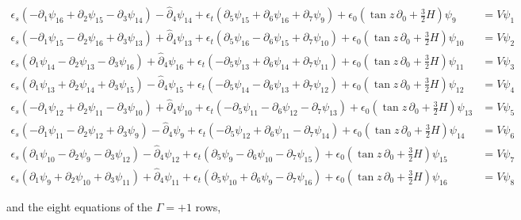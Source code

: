 \documentclass[11pt]{article}
\begin{document}
\[
\begin{aligned}
\epsilon_s(-\partial_1\psi_{16} + \partial_2\psi_{15} - \partial_3\psi_{14}) - \hat\partial_4\psi_{14} + \epsilon_t(\partial_5\psi_{15} + \partial_6\psi_{16} + \partial_7\psi_{9}) + \epsilon_0(\tan z\,\partial_0 + \tfrac32H)\psi_{9} &= V\psi_{1} \\
\epsilon_s(-\partial_1\psi_{15} - \partial_2\psi_{16} + \partial_3\psi_{13}) + \hat\partial_4\psi_{13} + \epsilon_t(\partial_5\psi_{16} - \partial_6\psi_{15} + \partial_7\psi_{10}) + \epsilon_0(\tan z\,\partial_0 + \tfrac32H)\psi_{10} &= V\psi_{2} \\
\epsilon_s(\partial_1\psi_{14} - \partial_2\psi_{13} - \partial_3\psi_{16}) + \hat\partial_4\psi_{16} + \epsilon_t(-\partial_5\psi_{13} + \partial_6\psi_{14} + \partial_7\psi_{11}) + \epsilon_0(\tan z\,\partial_0 + \tfrac32H)\psi_{11} &= V\psi_{3} \\
\epsilon_s(\partial_1\psi_{13} + \partial_2\psi_{14} + \partial_3\psi_{15}) - \hat\partial_4\psi_{15} + \epsilon_t(-\partial_5\psi_{14} - \partial_6\psi_{13} + \partial_7\psi_{12}) + \epsilon_0(\tan z\,\partial_0 + \tfrac32H)\psi_{12} &= V\psi_{4} \\
\epsilon_s(-\partial_1\psi_{12} + \partial_2\psi_{11} - \partial_3\psi_{10}) + \hat\partial_4\psi_{10} + \epsilon_t(-\partial_5\psi_{11} - \partial_6\psi_{12} - \partial_7\psi_{13}) + \epsilon_0(\tan z\,\partial_0 + \tfrac32H)\psi_{13} &= V\psi_{5} \\
\epsilon_s(-\partial_1\psi_{11} - \partial_2\psi_{12} + \partial_3\psi_{9}) - \hat\partial_4\psi_{9} + \epsilon_t(-\partial_5\psi_{12} + \partial_6\psi_{11} - \partial_7\psi_{14}) + \epsilon_0(\tan z\,\partial_0 + \tfrac32H)\psi_{14} &= V\psi_{6} \\
\epsilon_s(\partial_1\psi_{10} - \partial_2\psi_{9} - \partial_3\psi_{12}) - \hat\partial_4\psi_{12} + \epsilon_t(\partial_5\psi_{9} - \partial_6\psi_{10} - \partial_7\psi_{15}) + \epsilon_0(\tan z\,\partial_0 + \tfrac32H)\psi_{15} &= V\psi_{7} \\
\epsilon_s(\partial_1\psi_{9} + \partial_2\psi_{10} + \partial_3\psi_{11}) + \hat\partial_4\psi_{11} + \epsilon_t(\partial_5\psi_{10} + \partial_6\psi_{9} - \partial_7\psi_{16}) + \epsilon_0(\tan z\,\partial_0 + \tfrac32H)\psi_{16} &= V\psi_{8}
\end{aligned}
\]

and the eight equations of the $\Gamma = +1$ rows,
\end{document}
